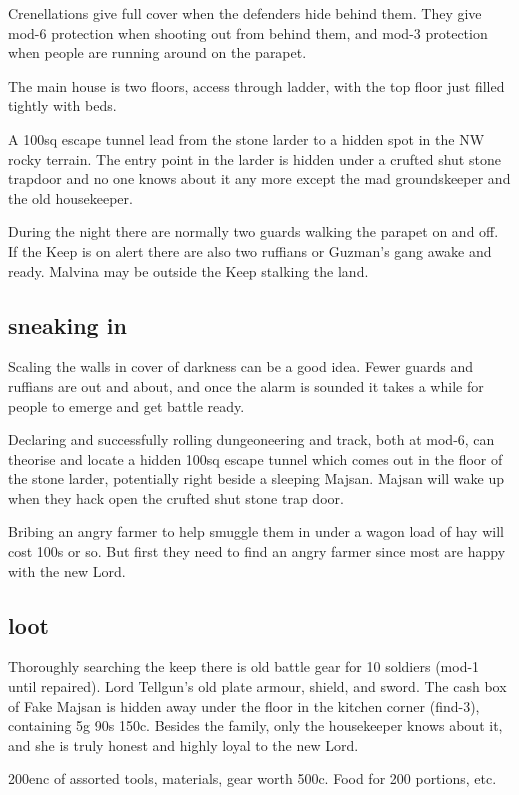Crenellations give full cover when the defenders hide behind them. They give mod-6 protection when shooting out from behind them, and mod-3 protection when people are running around on the parapet.

The main house is two floors, access through ladder, with the top floor just filled tightly with beds.

A 100sq escape tunnel lead from the stone larder to a hidden spot in the NW rocky terrain. The entry point in the larder is hidden under a crufted shut stone trapdoor and no one knows about it any more except the mad groundskeeper and the old housekeeper.

During the night there are normally two guards walking the parapet on and off. If the Keep is on alert there are also two ruffians or Guzman's gang awake and ready. Malvina may be outside the Keep stalking the land.


\subsection*{sneaking in}
Scaling the walls in cover of darkness can be a good idea. Fewer guards and ruffians are out and about, and once the alarm is sounded it takes a while for people to emerge and get battle ready.

Declaring and successfully rolling dungeoneering and track, both at mod-6, can theorise and locate a hidden 100sq escape tunnel which comes out in the floor of the stone larder, potentially right beside a sleeping Majsan. Majsan will wake up when they hack open the crufted shut stone trap door.

Bribing an angry farmer to help smuggle them in under a wagon load of hay will cost 100s or so. But first they need to find an angry farmer since most are happy with the new Lord.


\subsection*{loot}
Thoroughly searching the keep there is old battle gear for 10 soldiers (mod-1 until repaired). Lord Tellgun's old plate armour, shield, and sword. The cash box of Fake Majsan is hidden away under the floor in the kitchen corner (find-3), containing 5g 90s 150c. Besides the family, only the housekeeper knows about it, and she is truly honest and highly loyal to the new Lord.

200enc of assorted tools, materials, gear worth 500c. Food for 200 portions, etc.








